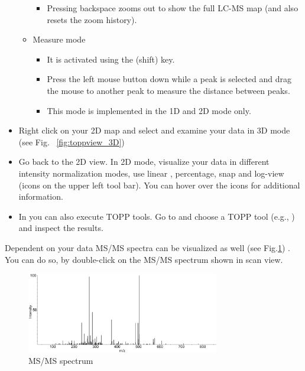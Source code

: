\begin{itemize}
\begin{itemize}
\begin{itemize}
        \item Pressing backspace \keys{\, \backspace \,\,} zooms out to show the full LC-MS map (and also resets the zoom history).
        \end{itemize}
    \item Measure mode
        \begin{itemize}
        \item It is activated using the \keys{\, \shift \,\,\, } (shift) key.
        \item Press the left mouse button down while a peak is selected and drag the mouse to
        			another peak to measure the distance between peaks.
        \item This mode is implemented in the 1D and 2D mode only.
        \end{itemize}
    \end{itemize}
\item Right click on your 2D map and select  and examine your
			data in 3D mode (see Fig. ~\ref{fig:toppview_3D})
\item Go back to the 2D view. In 2D mode, visualize your data in different intensity normalization modes, use linear , percentage, snap and log-view (icons on the upper left tool bar). You can hover over the icons for additional information. 
\item In  you can also execute TOPP tools. Go to
			 and choose a TOPP tool (e.g., ) and
			inspect the results.
\end{itemize}

\noindent Dependent on your data MS/MS spectra can be visualized as well (see Fig.\ref{fig:ms2}) . You can do so, by double-click on the MS/MS spectrum shown in scan view.
\newline
\begin{figure}[!htb]
\includegraphics[width=0.75\textwidth]{graphics/introduction/ms2_introduction.png}
\caption{MS/MS spectrum}
\label{fig:ms2}
\end{figure}


